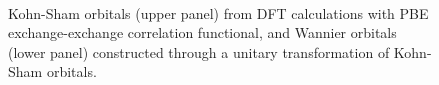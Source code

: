 \documentclass[aps, prb]{revtex4-1}
\begin{document}
\begin{figure}[hbt]
\centering
{}\quad
{}\quad
{}\quad
{}
\\
\quad
{}\quad
{}\quad
{}
\caption{Kohn-Sham orbitals (upper panel) from DFT calculations with PBE exchange-exchange correlation functional, and Wannier orbitals (lower panel) constructed through a unitary transformation of Kohn-Sham orbitals.}\label{fig:h4orb}
\end{figure}
\end{document}
